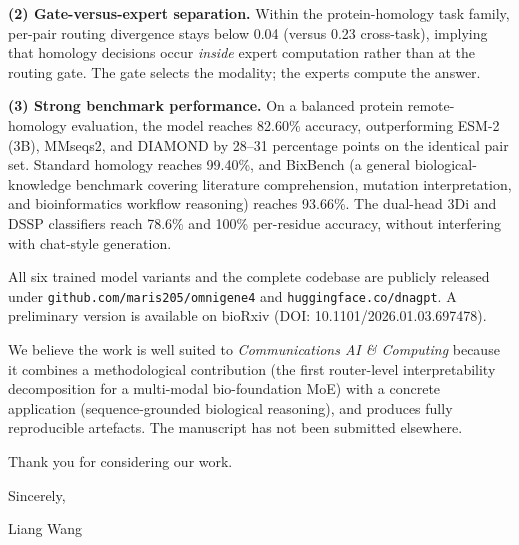 \documentclass[11pt]{article}
\begin{document}
\textbf{(2) Gate-versus-expert separation.} Within the protein-homology task family, per-pair routing divergence stays below 0.04 (versus 0.23 cross-task), implying that homology decisions occur \emph{inside} expert computation rather than at the routing gate. The gate selects the modality; the experts compute the answer.

\textbf{(3) Strong benchmark performance.} On a balanced protein remote-homology evaluation, the model reaches 82.60\% accuracy, outperforming ESM-2 (3B), MMseqs2, and DIAMOND by 28--31 percentage points on the identical pair set. Standard homology reaches 99.40\%, and BixBench (a general biological-knowledge benchmark covering literature comprehension, mutation interpretation, and bioinformatics workflow reasoning) reaches 93.66\%. The dual-head 3Di and DSSP classifiers reach 78.6\% and 100\% per-residue accuracy, without interfering with chat-style generation.

All six trained model variants and the complete codebase are publicly released under \texttt{github.com/maris205/omnigene4} and \texttt{huggingface.co/dnagpt}. A preliminary version is available on bioRxiv (DOI: 10.1101/2026.01.03.697478).

We believe the work is well suited to \textit{Communications AI \& Computing} because it combines a methodological contribution (the first router-level interpretability decomposition for a multi-modal bio-foundation MoE) with a concrete application (sequence-grounded biological reasoning), and produces fully reproducible artefacts. The manuscript has not been submitted elsewhere.

Thank you for considering our work.

\vspace{1em}

Sincerely,

\vspace{0.5em}

Liang Wang
\end{document}
